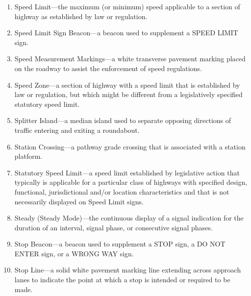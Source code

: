 \documentclass[9pt]{memoir}
\begin{document}
{\begin{enumerate}[label=\arabic*., ref=\arabic*]
\begin{enumerate}[label=\alph*., ref=(\alph*)]
\item Average Speed---the summation of the instantaneous or spot-measured speeds at a specific location of vehicles divided by the number of vehicles observed.
\item Design Speed---a selected speed used to determine the various geometric design features of a roadway.
\item 85th-Percentile Speed---the speed at or below which 85 percent of the motor vehicles travel.
\item Operating Speed---a speed at which a typical vehicle or the overall traffic operates. Operating speed might be defined with speed values such as the average, pace, or 85th-percentile speeds.
\item Pace---the 10 mph speed range representing the speeds of the largest percentage of vehicles in the traffic stream.
\end{enumerate}
\item Speed Limit---the maximum (or minimum) speed applicable to a section of highway as established by law or regulation.
\item Speed Limit Sign Beacon---a beacon used to supplement a SPEED LIMIT sign.
\item Speed Measurement Markings---a white transverse pavement marking placed on the roadway to assist the enforcement of speed regulations.
\item Speed Zone---a section of highway with a speed limit that is established by law or regulation, but which might be different from a legislatively specified statutory speed limit.
\item Splitter Island---a median island used to separate opposing directions of traffic entering and exiting a roundabout.
\item Station Crossing---a pathway grade crossing that is associated with a station platform.
\item Statutory Speed Limit---a speed limit established by legislative action that typically is applicable for a particular class of highways with specified design, functional, jurisdictional and/or location characteristics and that is not necessarily displayed on Speed Limit signs.
\item Steady (Steady Mode)---the continuous display of a signal indication for the duration of an interval, signal phase, or consecutive signal phases.
\item Stop Beacon---a beacon used to supplement a STOP sign, a DO NOT ENTER sign, or a WRONG WAY sign.
\item Stop Line---a solid white pavement marking line extending across approach lanes to indicate the point at which a stop is intended or required to be made.

\end{enumerate}}
\end{document}
